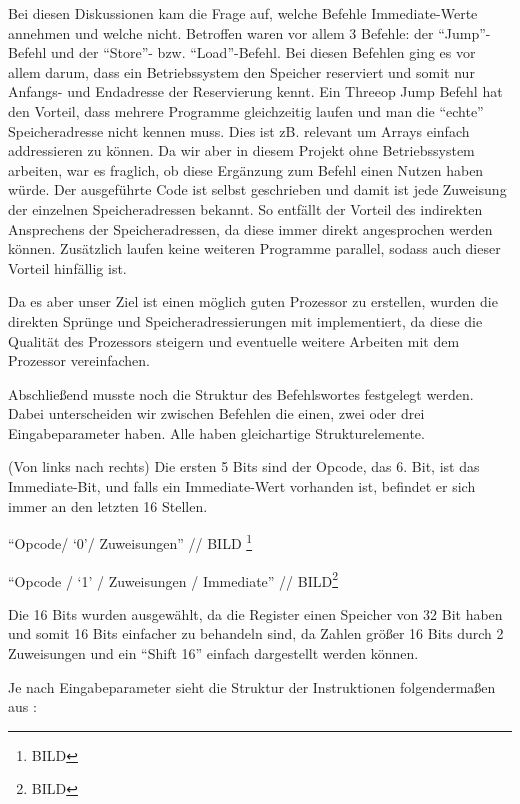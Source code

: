 \documentclass[paper=a4,fontsize=12pt,twocolumn]{scrreprt}
\begin{document}
Bei diesen Diskussionen kam die Frage auf, welche Befehle Immediate-Werte annehmen und welche nicht.
Betroffen waren vor allem 3 Befehle: der \enquote{Jump}-Befehl und der \enquote{Store}- bzw. \enquote{Load}-Befehl.
Bei diesen Befehlen ging es vor allem darum, dass ein Betriebssystem den Speicher reserviert und somit nur Anfangs- und Endadresse der Reservierung kennt.
Ein Threeop Jump Befehl hat den Vorteil, dass mehrere Programme gleichzeitig laufen und man die \enquote{echte} Speicheradresse nicht kennen muss.
Dies ist zB. relevant um Arrays einfach addressieren zu können.
Da wir aber in diesem Projekt ohne Betriebssystem arbeiten, war es fraglich, ob diese Ergänzung zum Befehl einen Nutzen haben würde.
Der ausgeführte Code ist selbst geschrieben und damit ist jede Zuweisung der einzelnen Speicheradressen bekannt.
So entfällt der Vorteil des indirekten Ansprechens der Speicheradressen, da diese immer direkt angesprochen werden können.
Zusätzlich laufen keine weiteren Programme parallel, sodass auch dieser Vorteil hinfällig ist.

Da es aber unser Ziel ist einen möglich guten Prozessor zu erstellen, wurden die direkten Sprünge und Speicheradressierungen mit implementiert, da diese die Qualität des Prozessors steigern und eventuelle weitere Arbeiten mit dem Prozessor vereinfachen.

Abschließend musste noch die Struktur des Befehlswortes festgelegt werden. Dabei unterscheiden wir zwischen Befehlen die einen, zwei oder drei Eingabeparameter haben.
Alle haben gleichartige Strukturelemente.

(Von links nach rechts) Die ersten 5 Bits sind der Opcode, das 6. Bit, ist das Immediate-Bit, und falls ein Immediate-Wert vorhanden ist, befindet er sich immer an den letzten 16 Stellen.

\enquote{Opcode/ \enquote{0}/ Zuweisungen}  // BILD \footnote{BILD}

\enquote{Opcode / \enquote{1} / Zuweisungen / Immediate} // BILD\footnote{BILD}

Die 16 Bits wurden ausgewählt, da die Register einen Speicher von 32 Bit haben und somit 16 Bits einfacher zu behandeln sind, da Zahlen größer 16 Bits durch 2 Zuweisungen und ein \enquote{Shift 16} einfach dargestellt werden können.

Je nach Eingabeparameter sieht die Struktur der Instruktionen folgendermaßen aus :
\end{document}
